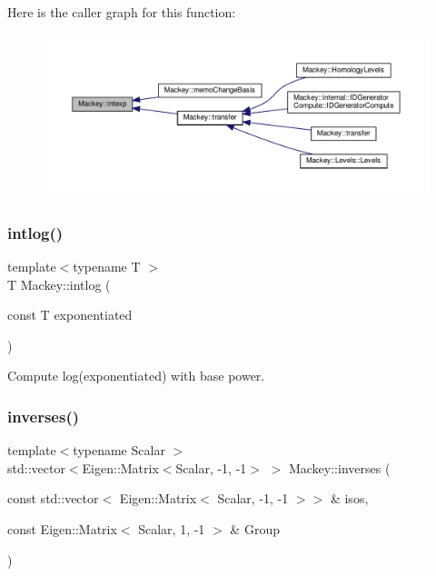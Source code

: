 Here is the caller graph for this function\+:\nopagebreak
\begin{figure}[H]
\begin{center}
\leavevmode
\includegraphics[width=350pt]{namespaceMackey_a4904fdc0fdcf3c23d7f3b80f59b2eafa_icgraph}
\end{center}
\end{figure}
\mbox{\label{namespaceMackey_aa0cac9097035c5fe8448742e22e6f78b}} 
\subsubsection{\texorpdfstring{intlog()}{intlog()}}
{\footnotesize\ttfamily template$<$typename T $>$ \\
T Mackey\+::intlog (\begin{DoxyParamCaption}\item[{const T}]{exponentiated }\end{DoxyParamCaption})\hspace{0.3cm}{\ttfamily [inline]}}



Compute log(exponentiated) with base power. 

\mbox{\label{namespaceMackey_ac8552763cbbe02f22cedc11c6f8434da}} 
\subsubsection{\texorpdfstring{inverses()}{inverses()}}
{\footnotesize\ttfamily template$<$typename Scalar $>$ \\
std\+::vector$<$Eigen\+::\+Matrix$<$Scalar, -\/1, -\/1$>$ $>$ Mackey\+::inverses (\begin{DoxyParamCaption}\item[{const std\+::vector$<$ Eigen\+::\+Matrix$<$ Scalar, -\/1, -\/1 $>$$>$ \&}]{isos,  }\item[{const Eigen\+::\+Matrix$<$ Scalar, 1, -\/1 $>$ \&}]{Group }\end{DoxyParamCaption})}



